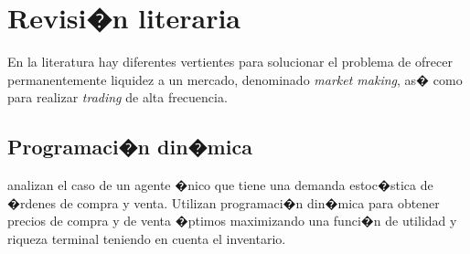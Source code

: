 \documentclass[12pt,a4paper,spanish]{article}%
\begin{document}
\section {Revisi�n literaria}\label{sec:revision}
En la literatura hay diferentes vertientes para solucionar el problema de ofrecer permanentemente liquidez a un mercado, denominado \textit{market making}, as� como para realizar \textit{trading} de alta frecuencia.

\subsection{Programaci�n din�mica}

\cite{Ho1981} analizan el caso de un agente �nico que tiene una demanda estoc�stica de �rdenes de compra y venta. Utilizan programaci�n din�mica para obtener precios de compra y de venta �ptimos maximizando una funci�n de utilidad y riqueza terminal teniendo en cuenta el inventario.
\end{document}
